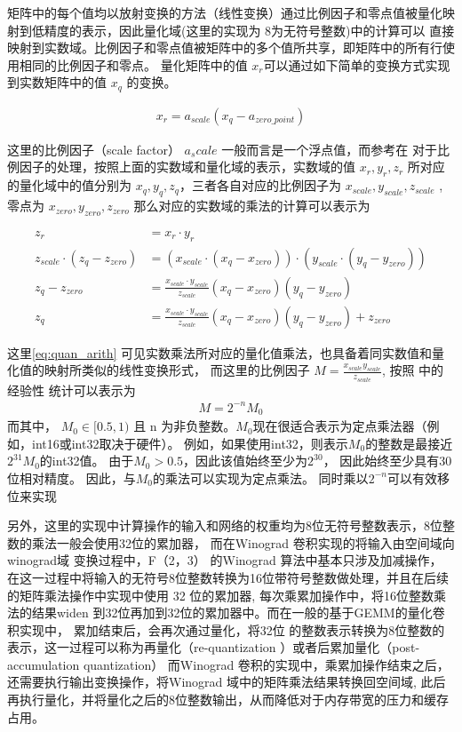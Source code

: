 矩阵中的每个值均以放射变换的方法（线性变换）通过比例因子和零点值被量化映射到低精度的表示，因此量化域(这里的实现为
8为无符号整数)中的计算可以
直接映射到实数域。比例因子和零点值被矩阵中的多个值所共享，即矩阵中的所有行使用相同的比例因子和零点。
量化矩阵中的值 $x_r$可以通过如下简单的变换方式实现到实数矩阵中的值 $x_q$ 的变换。

\begin{align}
  x_r = a_{scale} (x_q - a_{zero\_point})
\end{align}

这里的比例因子（scale factor） $a_scale$ 一般而言是一个浮点值，而参考在 \cite{Jacob2017QuantizationAT}
对于比例因子的处理，按照上面的实数域和量化域的表示，实数域的值 $x_r, y_r, z_r$ 所对应的量化域中的值分别为
$x_q, y_q, z_q$，三者各自对应的比例因子为 $x_{scale}, y_{scale}, z_{scale}$ , 零点为 $x_{zero}, y_{zero},
 z_{zero}$
那么对应的实数域的乘法的计算可以表示为

\begin{align}
\label{eq:quan_arith}
z_r &= x_r \cdot y_r\\
z_{scale} \cdot (z_q - z_{zero}) &= (x_{scale} \cdot (x_q - x_{zero})) \cdot (y_{scale} \cdot (y_q - y_{zero})) \\
z_q - z_{zero} &= \frac{x_{scale}\cdot y_{scale}}{z_{scale}} (x_q - x_{zero}) (y_q - y_{zero})\\
z_q &= \frac{x_{scale}\cdot y_{scale}}{z_{scale}} (x_q - x_{zero}) (y_q - y_{zero}) + z_{zero}
\end{align}

这里\ref{eq:quan_arith} 可见实数乘法所对应的量化值乘法，也具备着同实数值和量化值的映射所类似的线性变换形式，
而这里的比例因子 $ M = \frac{x_{scale} y_{scale}}{z_{scale}}$, 按照 \cite{Jacob2017QuantizationAT} 中的经验性
统计可以表示为
\begin{align}
M = 2^{-n} M_0
\end{align}
而其中， $M_0 \in [0.5, 1)$ 且 n 为非负整数。$ M_0$现在很适合表示为定点乘法器（例如，int16或int32取决于硬件）。
例如，如果使用int32，则表示$M_0$的整数是最接近$2^{31}M_0$的int32值。 由于$M_0> 0.5$，因此该值始终至少为$2^{30}$，
因此始终至少具有30位相对精度。 因此，与$M_0$的乘法可以实现为定点乘法。 同时乘以$2^{-n}$可以有效移位来实现

另外，这里的实现中计算操作的输入和网络的权重均为8位无符号整数表示，8位整数的乘法一般会使用32位的累加器，
而在Winograd 卷积实现的将输入由空间域向winograd域 变换过程中，F（2，3） 的Winograd 算法中基本只涉及加减操作，
在这一过程中将输入的无符号8位整数转换为16位带符号整数做处理，并且在后续的矩阵乘法操作中实现中使用 32 位的累加器,
每次乘累加操作中，将16位整数乘法的结果widen 到32位再加到32位的累加器中。而在一般的基于GEMM的量化卷积实现中，
累加结束后，会再次通过量化，将32位 的整数表示转换为8位整数的表示，这一过程可以称为再量化（re-quantization ）或者后累加量化（post-accumulation quantization）
而Winograd 卷积的实现中，乘累加操作结束之后，还需要执行输出变换操作，将Winograd 域中的矩阵乘法结果转换回空间域,
此后再执行量化，并将量化之后的8位整数输出，从而降低对于内存带宽的压力和缓存占用。

